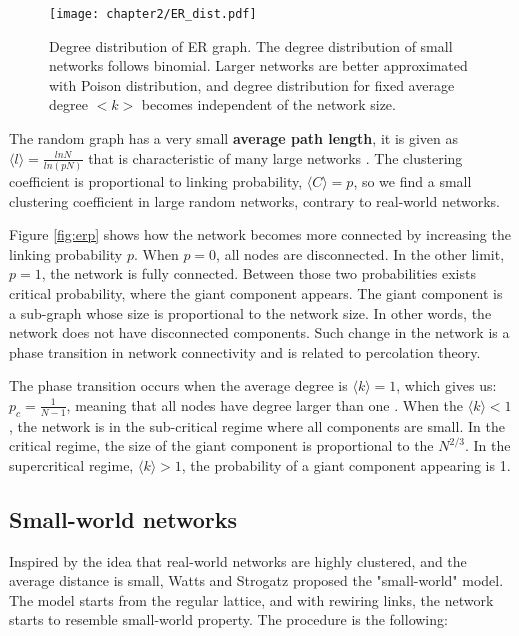 \begin{figure}[H]
	\centering
	\texttt{[image: chapter2/ER\_dist.pdf]}
	\caption[Degree distribution of Erdős-R\' {e}nyi graph.]{Degree distribution of ER graph. The degree distribution of small networks follows binomial. Larger networks are better approximated with Poison distribution, and degree distribution for fixed average degree $<k>$ becomes independent of the network size.}
	\label{fig:erdist}
\end{figure}

The random graph has a very small \textbf{average path length}, it is given as $\langle l \rangle = \frac{ln N}{ln(pN)}$ that is characteristic of many large networks \cite{bollobas2003mathematical}. The clustering coefficient is proportional to linking probability, $\langle C \rangle = p$, so we find a small clustering coefficient in large random networks, contrary to real-world networks.  %

Figure \ref{fig:erp} shows how the network becomes more connected by increasing the linking probability $p$. When $p=0$, all nodes are disconnected. In the other limit, $p=1$, the network is fully connected. Between those two probabilities exists critical probability, where the giant component appears. The giant component is a sub-graph whose size is proportional to the network size. In other words, the network does not have disconnected components. Such change in the network is a phase transition in network connectivity and is related to percolation theory. 

The phase transition occurs when the average degree is $ \langle k  \rangle = 1$, which gives us: $p_c = \frac{1}{N-1}$, meaning that all nodes have degree larger than one \cite{barabasi2016network}. When the $ \langle k  \rangle < 1$, the network is in the sub-critical regime where all components are small. In the critical regime, the size of the giant component is proportional to the $N^{2/3}$. In the supercritical regime, $ \langle k  \rangle > 1$, the probability of a giant component appearing is 1.

\subsection{Small-world networks}

Inspired by the idea that real-world networks are highly clustered, and the average distance is small, Watts and Strogatz \cite{watts1998collective} proposed the "small-world" model. The model starts from the regular lattice, and with rewiring links, the network starts to resemble small-world property. The procedure is the following:

